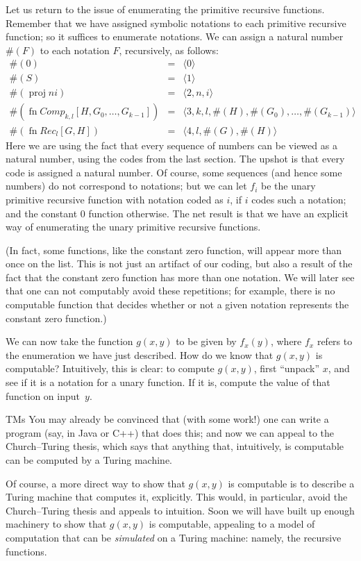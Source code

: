 \documentclass[10pt,a4paper]{article}
\theoremstyle{plain}
\theoremstyle{definition}
\theoremstyle{remark}
\newenvironment{digress}{}{}
\providecommand{\Proj}{\operatorname{proj}}
\providecommand{\fn}{\operatorname{fn}}
\providecommand{\fn}{\operatorname{fn}}
\begin{document}
Let us return to the issue of enumerating the primitive recursive
functions. Remember that we have assigned symbolic notations to each
primitive recursive function; so it suffices to enumerate
notations. We can assign a natural number $\#(F)$ to each notation $F$,
recursively, as follows:
\begin{eqnarray*}
\#(0) & = & \langle 0 \rangle \\
\#(S) & = & \langle 1 \rangle \\
\#(\Proj{n}{i}) & = & \langle 2, n, i \rangle \\
\#(\fn{Comp}_{k,l}[H,G_0,\dots,G_{k-1}]) & = & \langle
3,k,l,\#(H),\#(G_0),\dots,\#(G_{k-1}) \rangle \\
\#(\fn{Rec}_l[G,H]) & = & \langle 4, l, \#(G), \#(H) \rangle
\end{eqnarray*}
Here we are using the fact that every sequence of numbers can be viewed
as a natural number, using the codes from the last section. The upshot
is that every code is assigned a natural number. Of course, some
sequences (and hence some numbers) do not correspond to notations; but
we can let $f_i$ be the unary primitive recursive function with
notation coded as $i$, if $i$ codes such a notation; and the constant
$0$ function otherwise. The net result is that we have an explicit way of
enumerating the unary primitive recursive functions.

(In fact, some functions, like the constant zero function, will appear
more than once on the list. This is not just an artifact of our
coding, but also a result of the fact that the constant zero function has
more than one notation. We will later see that one can not computably
avoid these repetitions; for example, there is no computable function
that decides whether or not a given notation represents the constant
zero function.)

We can now take the function $g(x,y)$ to be given by $f_x(y)$, where
$f_x$ refers to the enumeration we have just described. How do we know
that $g(x,y)$ is computable? Intuitively, this is clear: to compute
$g(x,y)$, first ``unpack'' $x$, and see if it is a notation for a unary
function. If it is, compute the value of that function on input~$y$.

\begin{tagblock}{TMs}
\begin{digress}
You may already be convinced that (with some work!) one can write a
program (say, in Java or C++) that does this; and now we can appeal to
the Church--Turing thesis, which says that anything that, intuitively,
is computable can be computed by a Turing machine.

Of course, a more direct way to show that $g(x,y)$ is computable is to
describe a Turing machine that computes it, explicitly. This would,
in particular, avoid the Church--Turing thesis and appeals to
intuition. Soon we will have built up enough machinery to show
that $g(x,y)$ is computable, appealing to a model of computation that
can be \emph{simulated} on a Turing machine: namely, the recursive
functions.
\end{digress}
\end{tagblock}
\end{document}
